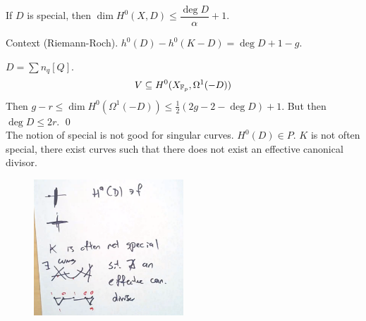 \begin{thm}[Clifford]
If $D$ is special, then $\dim H^0(X,D) \leq \dfrac{\deg D}{\alpha} + 1$. 
\end{thm}


Context (Riemann-Roch). $h^0(D) - h^0(K-D)= \deg D+1-g$.

\pf $D= \sum n_q [Q]$.
	\[
	V \subseteq H^0(X_{\mathbb{F}_p}, \Omega^1(-D))
	\]
Then $g-r \leq \dim H^0(\Omega^1(-D)) \leq \frac{1}{2} (2g-2 - \deg D)+1$. But then $\deg D \leq 2r$. \qed \\


The notion of special is not good for singular curves. $H^0(D) \in P$. $K$ is not often special, there exist curves such that there does not exist an effective canonical divisor. 


	\begin{figure}[!ht]
	\centering
	\includegraphics[width=0.5\textwidth]{../images/im11.png}
	\end{figure}



















